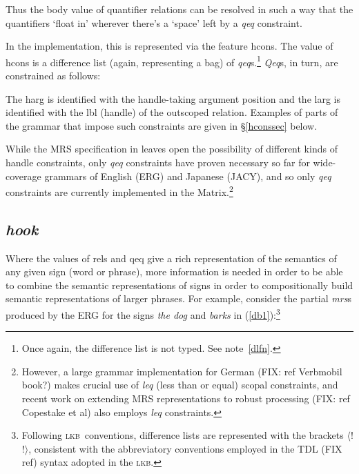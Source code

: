 \documentclass[12pt]{article}
\newcommand{\lkb}{\textsc{lkb}}
\newcommand{\es}{\enumsentence}
\newcommand{\fn}{\footnote}
\begin{document}
\noindent
Thus the {\sc body} value of quantifier relations can be resolved in
such a way that the quantifiers `float in' wherever there's a `space'
left by a {\it qeq} constraint.

In the implementation, this is represented via the feature {\sc
hcons}.  The value of {\sc hcons} is a difference list (again,
representing a bag) of {\it qeq}s.\fn{Once again, the difference list
is not typed.  See note~\ref{dlfn}.}  {\it Qeq}s, in turn, are
constrained as follows:

\es{
\begin{avm}
{\it qeq}: \[ harg & handle\\
	      larg & handle \]
\end{avm}
}

\noindent
The {\sc harg} is identified with the handle-taking argument position
and the {\sc larg} is identified with the {\sc lbl} (handle) of the outscoped
relation.  Examples of parts of the grammar that impose such constraints
are given in \S\ref{hconssec} below.

While the MRS specification in  leaves
open the possibility of different kinds of handle constraints, only
{\it qeq} constraints have proven necessary so far for wide-coverage
grammars of English (ERG) and Japanese (JACY), and so only
{\it qeq} constraints are currently implemented in the 
Matrix.\footnote{However, a large grammar implementation for German (FIX: ref 
Verbmobil book?) makes crucial use of {\it leq} (less than or equal) scopal
constraints, and recent work on extending MRS representations to robust 
processing (FIX: ref Copestake et al)
also employs {\it leq} constraints.}

\subsection{{\it hook}}
\label{hooksec}

Where the values of {\sc rels} and {\sc qeq} give a rich representation of 
the semantics of any given sign (word or phrase),
more information is needed in order to be able to combine the semantic
representations of signs in order to compositionally build
semantic representations of larger phrases.  For example, consider the
partial {\it mrs}s produced by the ERG for the signs {\it the dog} and 
{\it barks} in
(\ref{db1}):\fn{Following \lkb\ conventions, difference lists are
represented with the brackets $\langle$! !$\rangle$, consistent with the
abbreviatory conventions employed in the TDL (FIX ref)
syntax adopted in the \lkb.}
\end{document}
